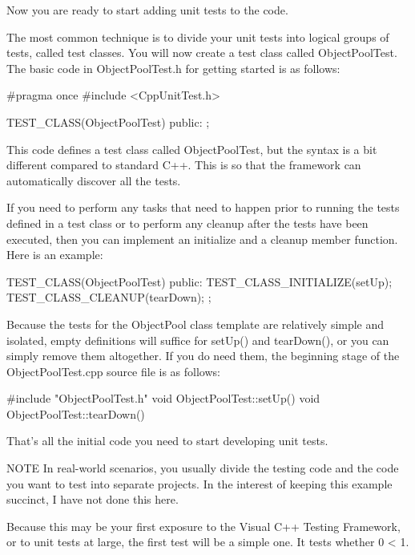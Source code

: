 Now you are ready to start adding unit tests to the code.

The most common technique is to divide your unit tests into logical groups of tests, called test classes. You will now create a test class called ObjectPoolTest. The basic code in ObjectPoolTest.h for getting started is as follows:

\begin{cpp}
#pragma once
#include <CppUnitTest.h>

TEST_CLASS(ObjectPoolTest)
{
    public:
};
\end{cpp}

This code defines a test class called ObjectPoolTest, but the syntax is a bit different compared to standard C++. This is so that the framework can automatically discover all the tests.

If you need to perform any tasks that need to happen prior to running the tests defined in a test class or to perform any cleanup after the tests have been executed, then you can implement an initialize and a cleanup member function. Here is an example:

\begin{cpp}
TEST_CLASS(ObjectPoolTest)
{
    public:
        TEST_CLASS_INITIALIZE(setUp);
        TEST_CLASS_CLEANUP(tearDown);
};
\end{cpp}

Because the tests for the ObjectPool class template are relatively simple and isolated, empty definitions will suffice for setUp() and tearDown(), or you can simply remove them altogether. If you do need them, the beginning stage of the ObjectPoolTest.cpp source file is as follows:

\begin{cpp}
#include "ObjectPoolTest.h"
void ObjectPoolTest::setUp() { }
void ObjectPoolTest::tearDown() { }
\end{cpp}

That’s all the initial code you need to start developing unit tests.

\begin{myNotic}{NOTE}
In real-world scenarios, you usually divide the testing code and the code you want to test into separate projects. In the interest of keeping this example succinct, I have not done this here.
\end{myNotic}


Because this may be your first exposure to the Visual C++ Testing Framework, or to unit tests at large, the first test will be a simple one. It tests whether 0 < 1.

